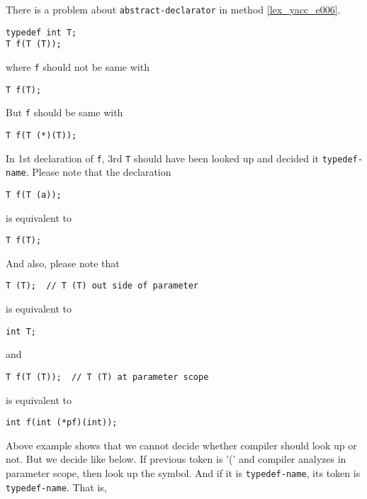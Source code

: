 There is a problem about {\tt{abstract-declarator}}
in method \ref{lex_yacc_e006}.
\begin{verbatim}
typedef int T;
T f(T (T));
\end{verbatim}
where {\tt{f}} should not be same with
\begin{verbatim}
T f(T);
\end{verbatim}
But {\tt{f}} should be same with
\begin{verbatim}
T f(T (*)(T));
\end{verbatim}
In 1st declaration of {\tt{f}}, 3rd {\tt{T}} should have been
looked up and decided it {\tt{typedef-name}}.
Please note that the declaration
\begin{verbatim}
T f(T (a));
\end{verbatim}
is equivalent to
\begin{verbatim}
T f(T);
\end{verbatim}
And also, please note that
\begin{verbatim}
T (T);  // T (T) out side of parameter
\end{verbatim}
is equivalent to
\begin{verbatim}
int T;
\end{verbatim}
and
\begin{verbatim}
T f(T (T));  // T (T) at parameter scope
\end{verbatim}
is equivalent to
\begin{verbatim}
int f(int (*pf)(int));
\end{verbatim}

Above example shows that
we cannot decide whether compiler should look up or not.
But we decide like below.
If previous token is '(' and compiler analyzes
in parameter scope, then look up the symbol. And
if it is {\tt{typedef-name}}, its token is {\tt{typedef-name}}.
That is,

